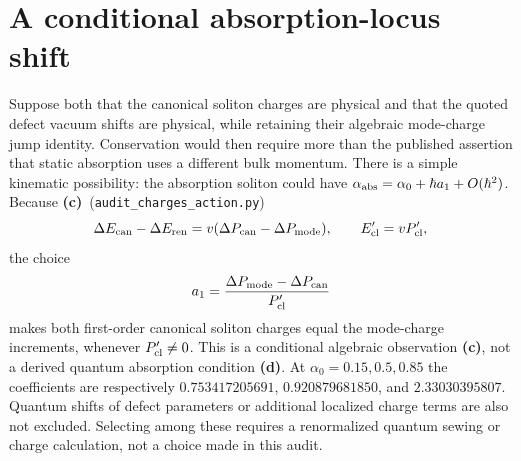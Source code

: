 \documentclass[11pt,a4paper]{article}
\newcommand{\Lc}{\textbf{(c)}}
\newcommand{\Ld}{\textbf{(d)}}
\newcommand{\scr}{\texttt{audit\_\allowbreak charges\_\allowbreak action.py}}
\begin{document}
\section{A conditional absorption-locus shift}
Suppose both that the canonical soliton charges are physical and that the
quoted defect vacuum shifts are physical, while retaining their algebraic
mode-charge jump identity. Conservation would then require more than the
published assertion that static absorption uses a different bulk momentum.
There is a simple kinematic possibility: the absorption soliton could have
$\alpha_{\rm abs}=\alpha_0+\hbar a_1+O(\hbar^2)$.
Because \Lc\ (\scr)
\begin{equation}
 \Delta E_{\rm can}-\Delta E_{\rm ren}
       =v(\Delta P_{\rm can}-\Delta P_{\rm mode}),\qquad
 E_{\rm cl}'=vP_{\rm cl}',
\end{equation}
the choice
\begin{equation}
 a_1=\frac{\Delta P_{\rm mode}-\Delta P_{\rm can}}{P_{\rm cl}'}
 \label{eq:shift}
\end{equation}
makes both first-order canonical soliton charges equal the mode-charge
increments, whenever $P_{\rm cl}'\ne0$. This is a conditional algebraic
observation \Lc, not a derived quantum absorption condition \Ld.
At $\alpha_0=0.15,0.5,0.85$ the coefficients are respectively
$0.753417205691$, $0.920879681850$, and $2.33030395807$.
Quantum shifts of defect parameters or additional localized charge terms
are also not excluded. Selecting among these requires a renormalized
quantum sewing or charge calculation, not a choice made in this audit.
\end{document}
